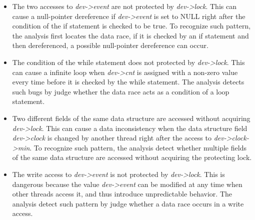 \begin{itemize}
	\item {} The two accesses to {\em dev->event} 
	are not protected by {\em dev->lock}. This can cause a null-pointer 
	dereference if {\em dev->event} is set to NULL right after the condition of 
	the if statement is checked to be true. To recognize such pattern, the 
	analysis first locates the data race, if it is checked by an if statement 
	and then dereferenced, a possible null-pointer dereference can occur.
	\item {} The condition of the while statement does not 
	protected by {\em dev->lock}. This can cause a infinite loop when {\em 
	dev->cnt} is assigned with a non-zero value every time before it is checked 
	by the while statement. The analysis detects such bugs by judge whether the 
	data race acts as a condition of a loop statement.
	\item {} Two different fields of the same data 
	structure are accessed without acquiring {\em dev->lock}. This can cause a 
	data inconsistency when the data structure field {\em dev->clock} is 
	changed by another thread right after the access to {\em dev->clock->min}. 
	To recognize such pattern, the analysis detect whether multiple fields of 
	the same data structure are accessed without acquiring the protecting lock.
	\item {} The write access to {\em dev->event} is not 
	protected by {\em dev->lock}. This is dangerous because the value {\em 
	dev->event} can be modified at any time when other threads access it, and 
	thus introduce unpredictable behavior. The analysis detect such pattern by 
	judge whether a data race occurs in a write access.
\end{itemize}
